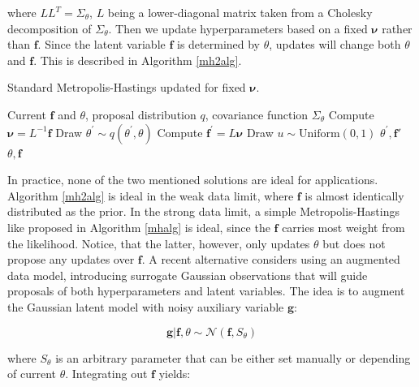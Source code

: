 \documentclass[10pt,a4paper,twoside]{book}
\begin{document}
where $LL^T = \Sigma_\theta$, $L$ being a lower-diagonal matrix taken from a Cholesky decomposition of $\Sigma_\theta$. Then we update hyperparameters based on a fixed $\boldsymbol{\nu}$ rather than $\boldsymbol{f}$. Since the latent variable $\boldsymbol{f}$ is determined by $\theta$, updates will change both $\theta$ and $\boldsymbol{f}$. This is described in Algorithm \ref{mh2alg}.



\begin{algorithm}
	\caption{Standard Metropolis-Hastings updated for fixed $\boldsymbol{\nu}$.}
		\label{mh2alg}
		\begin{algorithmic}[1]
		\Require Current $\boldsymbol{f}$ and $\theta$, proposal distribution $q$, covariance function $\Sigma_\theta$ 
		\State Compute $\boldsymbol{\nu} = L^{-1}\boldsymbol{f}$
		\State Draw $\theta^{'} \sim q(\theta^{'}, \theta)$
		\State Compute $\boldsymbol{f}^{'} = L \boldsymbol{\nu}$
		\State Draw $u\sim \mathrm{Uniform}(0, 1)$
				\Return $\theta^{'}, \boldsymbol{f'}$
				\Else \;
				\Return $\theta, \boldsymbol{f}$
				\EndIf
		\end{algorithmic}
\end{algorithm}



In practice, none of the two mentioned solutions are ideal for applications. Algorithm \ref{mh2alg} is ideal in the weak data limit, where $\boldsymbol{f}$ is almost identically distributed as the prior. In the strong data limit, a simple Metropolis-Hastings like proposed in Algorithm \ref{mhalg} is ideal, since the $\boldsymbol{f}$ carries most weight from the likelihood. Notice, that the latter, however, only updates $\theta$ but does not propose any updates over $\boldsymbol{f}$. A recent alternative considers using an augmented data model, introducing surrogate Gaussian observations that will guide proposals of both hyperparameters and latent variables. The idea is to augment the Gaussian latent model with noisy auxiliary variable $\boldsymbol{g}$:

\begin{equation}\label{tointegrate}
\boldsymbol{g}|\boldsymbol{f},\theta \sim \mathcal{N}(\boldsymbol{f}, S_{\theta})
\end{equation}

where $S_\theta$ is an arbitrary parameter that can be either set manually or depending of current $\theta$. Integrating out $\boldsymbol{f}$ yields:
\end{document}

